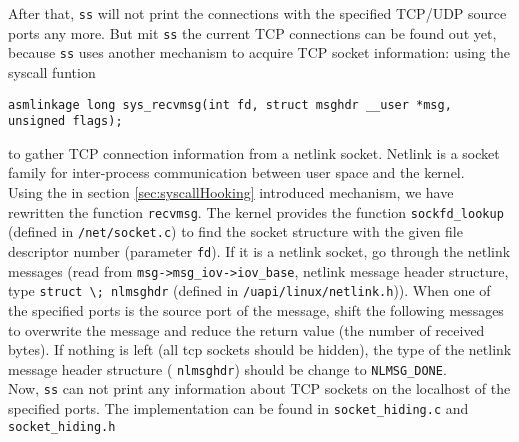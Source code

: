 After that, \texttt{ss} will not print the connections with the specified 
TCP/UDP source ports any more. But mit \texttt{ss} the current TCP connections 
can be found out yet, because \texttt{ss} uses another mechanism to acquire TCP 
socket information: using the syscall funtion 
\begin{center}
\lstset{escapechar=,style=customc}
\begin{lstlisting}
asmlinkage long sys_recvmsg(int fd, struct msghdr __user *msg, unsigned flags);
\end{lstlisting}
\end{center}
to gather TCP connection information from a netlink socket. Netlink is a socket 
family for inter-process communication between user space and the kernel.\\
Using the in section \ref{sec:syscallHooking} introduced mechanism, we have 
rewritten the function \verb+recvmsg+. The kernel provides the function 
\verb+sockfd_lookup+ (defined in \verb+/net/socket.c+) to find the socket 
structure with the given file descriptor number (parameter \verb+fd+). If it is 
a netlink socket, go through the netlink messages (read from 
\verb+msg->msg_iov->iov_base+, netlink message header structure, type 
\verb+struct \; nlmsghdr+ (defined in \verb+/uapi/linux/netlink.h+)). When one 
of the specified ports is the source port of the message, shift the following 
messages to overwrite the message and reduce the return value (the number of 
received bytes). If nothing is left (all tcp sockets should be hidden), the type 
of the netlink message header structure ( \verb+nlmsghdr+) should be change to 
\verb+NLMSG_DONE+. \\
Now, \texttt{ss} can not print any information about TCP sockets on the 
localhost of the specified ports. The implementation can be found in 
\verb+socket_hiding.c+ and \verb+socket_hiding.h+\\

